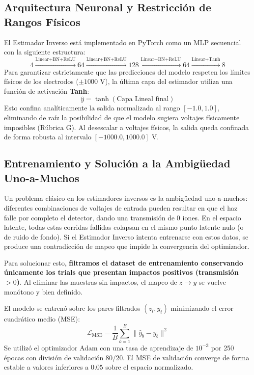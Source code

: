 \documentclass[12pt,letterpaper]{article}
\begin{document}
\subsection{Arquitectura Neuronal y Restricción de Rangos Físicos}
El Estimador Inverso está implementado en PyTorch como un MLP secuencial con la siguiente estructura:
\begin{equation}
    4 \xrightarrow{\text{Linear+BN+ReLU}} 64 \xrightarrow{\text{Linear+BN+ReLU}} 128 \xrightarrow{\text{Linear+BN+ReLU}} 64 \xrightarrow{\text{Linear+Tanh}} 8
\end{equation}
Para garantizar estrictamente que las predicciones del modelo respeten los límites físicos de los electrodos ($\pm 1000\text{ V}$), la última capa del estimador utiliza una función de activación \textbf{Tanh}:
\begin{equation}
    \hat{y} = \tanh(\text{Capa Lineal final})
\end{equation}
Esto confina analíticamente la salida normalizada al rango $[-1.0, 1.0]$, eliminando de raíz la posibilidad de que el modelo sugiera voltajes físicamente imposibles (Rúbrica G). Al desescalar a voltajes físicos, la salida queda confinada de forma robusta al intervalo $[-1000.0, 1000.0]\text{ V}$.

\subsection{Entrenamiento y Solución a la Ambigüedad Uno-a-Muchos}
Un problema clásico en los estimadores inversos es la ambigüedad uno-a-muchos: diferentes combinaciones de voltajes de entrada pueden resultar en que el haz falle por completo el detector, dando una transmisión de $0$ iones. En el espacio latente, todas estas corridas fallidas colapsan en el mismo punto latente nulo (o de ruido de fondo). Si el Estimador Inverso intenta entrenarse con estos datos, se produce una contradicción de mapeo que impide la convergencia del optimizador.

Para solucionar esto, \textbf{filtramos el dataset de entrenamiento conservando únicamente los trials que presentan impactos positivos (transmisión $> 0$)}. Al eliminar las muestras sin impactos, el mapeo de $z \rightarrow y$ se vuelve monótono y bien definido. 

El modelo se entrenó sobre los pares filtrados $(z_i, y_i)$ minimizando el error cuadrático medio (MSE):
\begin{equation}
    \mathcal{L}_{\text{MSE}} = \frac{1}{B} \sum_{b=1}^{B} \|\hat{y}_b - y_b\|^2
\end{equation}
Se utilizó el optimizador Adam con una tasa de aprendizaje de $10^{-3}$ por 250 épocas con división de validación 80/20. El MSE de validación converge de forma estable a valores inferiores a $0.05$ sobre el espacio normalizado.
\end{document}

